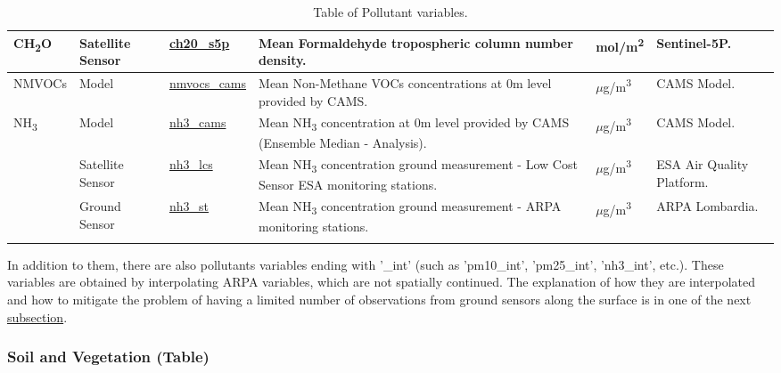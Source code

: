 \begin{center}
\begin{longtable}{ |p{1.5cm}|p{1.5cm}|p{2.3cm}|p{4cm}|p{2cm}|p{2.3cm}| }
 \multirow{1}{4em}{CH\textsubscript{2}O}& Satellite \newline Sensor  & \underline{ch20\_s5p} &  Mean Formaldehyde tropospheric column number density. \par & mol/m\textsuperscript{2} & Sentinel-5P.\\ \hline
 
\multirow{1}{4em}{NMVOCs}& Model  & \underline{nmvocs\_cams} & Mean Non-Methane VOCs concentrations at 0m level provided by CAMS.\par & $\mu$g/m\textsuperscript{3} & CAMS Model.\\ \hline

\multirow{3}{4em}{NH\textsubscript{3}} & Model  & \underline{nh3\_cams} & Mean NH\textsubscript{3} concentration at 0m level provided by CAMS  (Ensemble Median - Analysis).\par & $\mu$g/m\textsuperscript{3} & CAMS Model.\\ 
& Satellite \newline Sensor  & \underline{nh3\_lcs} &  Mean NH\textsubscript{3} concentration ground measurement - Low Cost Sensor ESA monitoring stations. \par  & $\mu$g/m\textsuperscript{3} & ESA Air Quality Platform.\\ 
& Ground \newline Sensor & \underline{nh3\_st} &  Mean NH\textsubscript{3} concentration ground measurement - ARPA monitoring stations. \par & $\mu$g/m\textsuperscript{3} & ARPA \newline Lombardia.\\ \hline
\caption{Table of Pollutant variables.}
\end{longtable}
\end{center}
In addition to them, there are also pollutants variables ending with '\_int' (such as 'pm10\_int', 'pm25\_int', 'nh3\_int', etc.). These variables are obtained by interpolating ARPA variables, which are not spatially continued. The explanation of how they are interpolated and how to mitigate the problem of having a limited number of observations from ground sensors along the surface is in one of the next \hyperref[subsec:nan]{subsection}.
\subsubsection{Soil and Vegetation (Table)}

